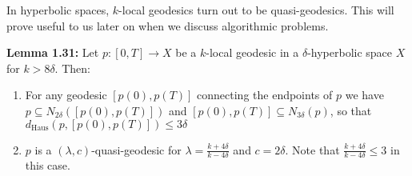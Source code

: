 \documentclass[12pt]{article}
\newcommand{\vs}{\vskip10pt}
\begin{document}
	In hyperbolic spaces, $k$-local geodesics turn out to be quasi-geodesics. This will prove useful to us later on when we discuss algorithmic problems. 
	
	\vs 
	
	\textbf{Lemma 1.31: } Let $p: [0, T] \rightarrow X$ be a $k$-local geodesic in a $\delta$-hyperbolic space $X$ for $k > 8\delta$. Then: 
	
	\begin{enumerate} [label = (\roman*)]
		\item For any geodesic $[p(0), p(T)]$ connecting the endpoints of $p$ we have $p \subseteq N_{2 \delta}([p(0), p(T)])$ and $[p(0), p(T)] \subseteq N_{3 \delta}(p)$, so that $d_{\text{Haus}}(p, [p(0), p(T)]) \leq 3 \delta$ 
		\item 	$p$ is a $(\lambda, c)$-quasi-geodesic for $\lambda = \frac{k + 4 \delta}{k - 4\delta}$ and $c = 2\delta$. Note that $\frac{k + 4 \delta}{k - 4\delta} \leq 3$ in this case. 
	\end{enumerate}
	
\end{document}
